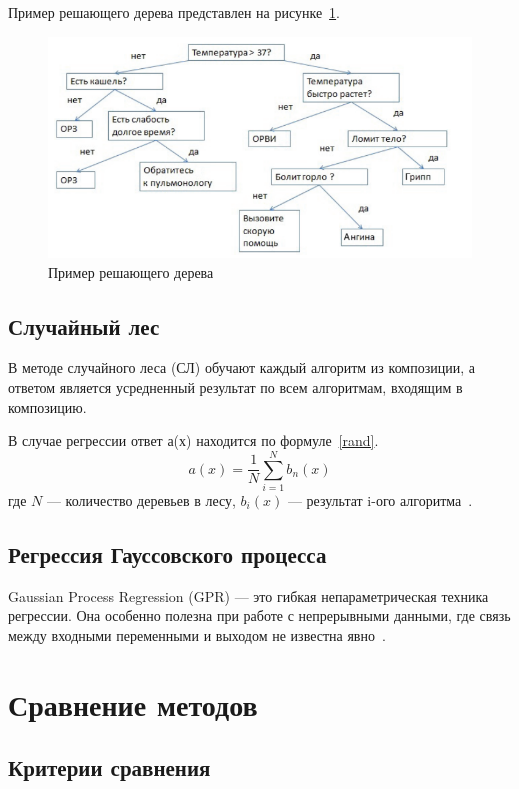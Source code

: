 \documentclass[a4paper, 14pt]{extreport}
\begin{document}
Пример решающего дерева представлен на рисунке~\ref{tree}.

\begin{figure}[h]
	\centering
	\includegraphics[scale=1]{tools/tree-ex.png}
	\caption{Пример решающего дерева}
	\label{tree}
\end{figure}

\section{Случайный лес}

В методе случайного леса (СЛ) обучают каждый алгоритм из композиции, а ответом является усредненный результат по всем 
алгоритмам, входящим в композицию.

В случае регрессии ответ а(х) находится по формуле~\ref{rand}.
\begin{equation}
	\label{rand}
	a(x) = \frac{1}{N} \sum \limits_{i=1}^{N} b_n(x)
\end{equation}
где $N$ --- количество деревьев в лесу, $b_i(x)$ --- результат i-ого алгоритма~\cite{limanovskaya}.

\section{Регрессия Гауссовского процесса}

Gaussian Process Regression (GPR) --- это гибкая непараметрическая техника регрессии. Она особенно полезна при работе с 
непрерывными данными, где связь между входными переменными и выходом не известна явно~\cite{kashtaeva}.

\chapter{Сравнение методов}

\section{Критерии сравнения}
\end{document}

